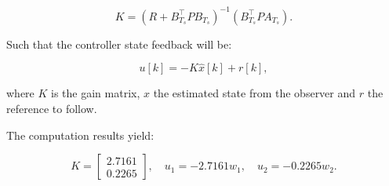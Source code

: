 \[
K = \left( R + B_{T_s}^\top P B_{T_s} \right)^{-1} \left(B_{T_s}^\top P A_{T_s} \right).
\]

Such that the controller state feedback will be:

\[
u[k] = -K \hat{x}[k] + r[k],
\]

where \( K \) is the gain matrix, $\hat{x}$ the estimated state from the observer and $r$ the reference to follow.

The computation results yield:

\[
K = \begin{bmatrix}
        2.7161 \\ 0.2265
\end{bmatrix}, \quad u_{1} = -2.7161 w_{1}, \quad u_{2} = -0.2265 w_{2}.
\]
